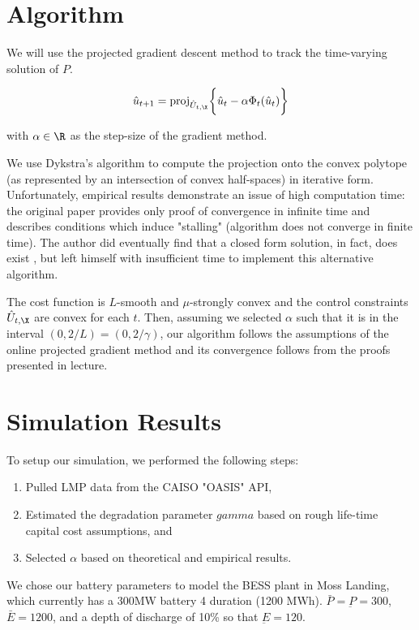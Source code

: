 \documentclass{homework}
\begin{document}
\section{Algorithm}
We will use the projected gradient descent method to track the time-varying solution of $P$.

\begin{equation}
    \hat{u}_{t+1} = \text{proj}_{\hat{U}_{t,\X}} \biggl\{
        \hat{u}_t - \alpha \Phi_t(\hat{u}_t)
    \biggr\}
\end{equation}

with $\alpha\in\R$ as the step-size of the gradient method.

We use Dykstra's algorithm\cite{boyle_method_1986} to
compute the projection onto the convex polytope (as represented by an
intersection of convex half-spaces) in iterative form.
Unfortunately, empirical results demonstrate
an issue of high computation time: the original paper provides only proof of
convergence in infinite time and \cite{bauschke_dykstras_2020} describes
conditions which induce "stalling" (algorithm does not converge in finite time).
The author did eventually find that a closed form solution, in fact, does exist
\cite{rutkowski_closed-form_2017}, but left himself with insufficient time to
implement this alternative algorithm.

The cost function is $L$-smooth and $\mu$-strongly convex and
the control constraints $\hat{U}_{t,\X}$
are convex for each $t$. Then, assuming we selected $\alpha$ such that it is
in the interval $(0, 2/L) = (0, 2/\gamma)$, our algorithm follows the
assumptions of the online projected gradient method and
its convergence follows from the proofs presented in lecture.

\section{Simulation Results}

To setup our simulation, we performed the following steps:
\begin{enumerate}
    \item Pulled LMP data from the CAISO "OASIS" API,
    \item Estimated the degradation parameter $gamma$ based on rough life-time
        capital cost assumptions, and
    \item Selected $\alpha$ based on theoretical and empirical results.
\end{enumerate}

We chose our battery parameters to model the BESS plant in Moss Landing, which
currently has a 300MW battery 4 duration (1200 MWh). $\bar{P} = \underbar{P} = 300$,
$\bar{E} = 1200$, and a depth of discharge of 10\% so that $\underbar{E} = 120$.
\end{document}
